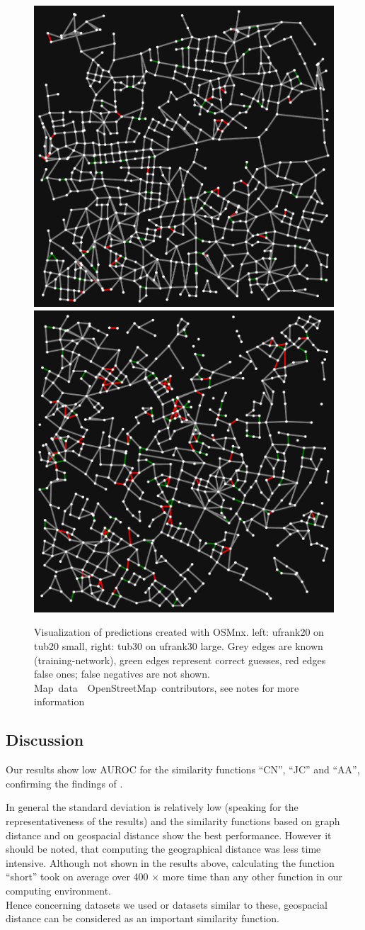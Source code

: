 \documentclass[12pt,a4paper]{IEEEtran}
\newcommand{\osmattribute}[1][]{\mbox{#1 \textrm{\textcopyright} OpenStreetMap contributors}}
\begin{document}
\begin{figure}[tb]
\centering
\includegraphics[width=.485\columnwidth]{graphics/tub_random_forest_classifier_cross_small.pdf}%
\hfill%
\includegraphics[width=.485\columnwidth]{graphics/ufrank_random_forest_classifier_cross_30_large.pdf}
\caption{Visualization of predictions created with OSMnx. left: ufrank20 on tub20 small, right: tub30 on ufrank30 large.
Grey edges are known (training-network), green edges represent correct guesses, red edges false ones; false negatives are not shown.
\osmattribute[Map data], see notes for more information}
\label{fig:classifier_predictions}
\end{figure}

\subsection{Discussion}

Our results show low AUROC for the similarity functions \enquote{CN}, \enquote{JC} and \enquote{AA},
confirming the findings of \citeauthor{road_link_prediction_subgraph}.~\cite[see][20]{road_link_prediction_subgraph}

In general the standard deviation is relatively low (speaking for the representativeness of the results)
and the similarity functions based on graph distance and on geospacial distance show the best performance.
However it should be noted, that computing the geographical distance was less time intensive.
Although not shown in the results above, calculating the function \enquote{short}
took on average over 400 \(\times\) more time than any other function in our computing environment.\\
Hence concerning datasets we used or datasets similar to these,
geospacial distance can be considered as an important similarity function.
\end{document}
